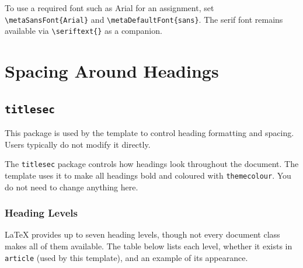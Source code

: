 		To use a required font such as Arial for an assignment, set \texttt{\textbackslash metaSansFont\{Arial\}} and \texttt{\textbackslash metaDefaultFont\{sans\}}. The serif font remains available via \texttt{\textbackslash seriftext\{\}} as a companion.

\section{Spacing Around Headings}

	\subsection{\texttt{titlesec}}
	\noindent\colorbox{themecolour!15}{\parbox{\linewidth}{\small This package is used by the template to control heading formatting and spacing. Users typically do not modify it directly.}}\vspace{0.5\baselineskip}
	
	The \texttt{titlesec} package controls how headings look throughout the document. The template uses it to make all headings bold and coloured with \texttt{themecolour}. You do not need to change anything here.
	
		\subsubsection{Heading Levels}
		\LaTeX{} provides up to seven heading levels, though not every document class makes all of them available. The table below lists each level, whether it exists in \texttt{article} (used by this template), and an example of its appearance.
		
